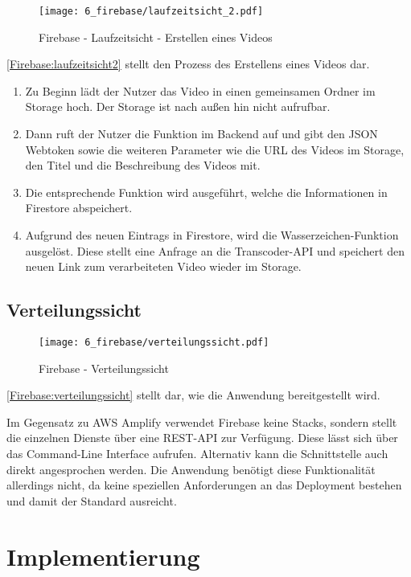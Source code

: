 \begin{figure}
  \centering
  \texttt{[image: 6\_firebase/laufzeitsicht\_2.pdf]}
  \caption{Firebase - Laufzeitsicht - Erstellen eines Videos}
  \label{Firebase:laufzeitsicht2}
\end{figure}

\autoref{Firebase:laufzeitsicht2} stellt den Prozess des Erstellens eines Videos dar.
\begin{enumerate}
  \item{Zu Beginn lädt der Nutzer das Video in einen gemeinsamen Ordner im Storage hoch. Der Storage ist nach außen hin nicht aufrufbar.}
  \item{Dann ruft der Nutzer die Funktion im Backend auf und gibt den JSON Webtoken sowie die weiteren Parameter wie die URL des Videos im Storage, den Titel und die Beschreibung des Videos mit.}
  \item{Die entsprechende Funktion wird ausgeführt, welche die Informationen in Firestore abspeichert.}
  \item{Aufgrund des neuen Eintrags in Firestore, wird die Wasserzeichen-Funktion ausgelöst. Diese stellt eine Anfrage an die Transcoder-API und speichert den neuen Link zum verarbeiteten Video wieder im Storage.}
\end{enumerate}

\subsection{Verteilungssicht}

\begin{figure}
  \centering
  \texttt{[image: 6\_firebase/verteilungssicht.pdf]}
  \caption{Firebase - Verteilungssicht}
  \label{Firebase:verteilungssicht}
\end{figure}

\autoref{Firebase:verteilungssicht} stellt dar, wie die Anwendung bereitgestellt wird.

Im Gegensatz zu \ac{AWS} Amplify verwendet Firebase keine Stacks, sondern stellt die einzelnen Dienste über eine REST-API zur Verfügung. Diese lässt sich über das Command-Line Interface aufrufen. Alternativ kann die Schnittstelle auch direkt angesprochen werden. Die Anwendung benötigt diese Funktionalität allerdings nicht, da keine speziellen Anforderungen an das Deployment bestehen und damit der Standard ausreicht.

\section{Implementierung}

